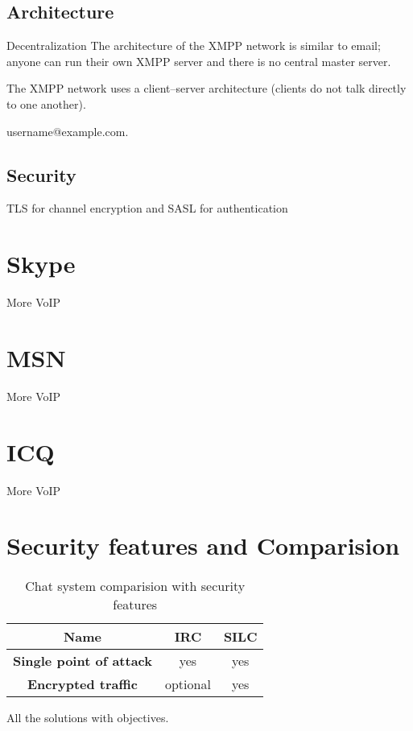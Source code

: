 \subsection{Architecture}

Decentralization
The architecture of the XMPP network is similar to email; anyone can run their own XMPP server and there is no central master server.

The XMPP network uses a client–server architecture (clients do not talk directly to one another). 

username@example.com.
\subsection{Security}
TLS for channel encryption and SASL for authentication

\section{Skype}
More VoIP
\section{MSN}
More VoIP
\section{ICQ}
More VoIP


\section{Security features and Comparision}

\begin{longtable}{|c|c|c|}
\caption{Chat system comparision with security features}\\
\hline
\textbf{Name} & \textbf{IRC} & \textbf{SILC}\\
\hline
\textbf{Single point of attack} & yes & yes\\
\hline
\textbf{Encrypted traffic} & optional & yes\\
\hline
\end{longtable}

All the solutions with objectives.
